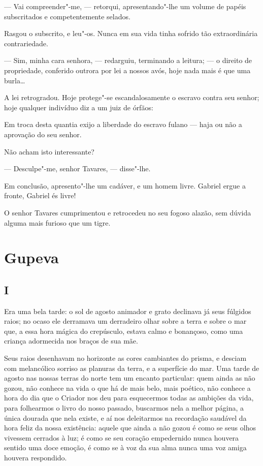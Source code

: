 --- Vai compreender"-me, --- retorqui, apresentando"-lhe um volume de
papéis subscritados e competentemente selados.

Rasgou o subscrito, e leu"-os. Nunca em sua vida tinha sofrido tão
extraordinária contrariedade.

--- Sim, minha cara senhora, --- redarguiu, terminando a leitura; --- o
direito de propriedade, conferido outrora por lei a nossos avós, hoje
nada mais é que uma burla\ldots{}

A lei retrogradou. Hoje protege"-se escandalosamente o escravo contra seu
senhor; hoje qualquer indivíduo diz a um juiz de órfãos:

Em troca desta quantia exijo a liberdade do escravo fulano --- haja ou
não a aprovação do seu senhor.

Não acham isto interessante?

--- Desculpe"-me, senhor Tavares, --- disse"-lhe.

Em conclusão, apresento"-lhe um cadáver, e um homem livre. Gabriel ergue
a fronte, Gabriel és livre!

O senhor Tavares cumprimentou e retrocedeu no seu fogoso alazão, sem
dúvida alguma mais furioso que um tigre.

\chapter{Gupeva}

\section{I}

Era uma bela tarde: o sol de agosto animador e grato declinava já seus
fúlgidos raios; no ocaso ele derramava um derradeiro olhar sobre a terra
e sobre o mar que, a essa hora mágica do crepúsculo, estava calmo e
bonançoso, como uma criança adormecida nos braços de sua mãe.

Seus raios desenhavam no horizonte as cores cambiantes do prisma, e
desciam com melancólico sorriso as planuras da terra, e a superfície do
mar. Uma tarde de agosto nas nossas terras do norte tem um encanto
particular: quem ainda as não gozou, não conhece na vida o que há de
mais belo, mais poético, não conhece a hora do dia que o Criador nos deu
para esquecermos todas as ambições da vida, para folhearmos o livro do
nosso passado, buscarmos nela a melhor página, a única dourada que nela
existe, e aí nos deleitarmos na recordação saudável da hora feliz da
nossa existência: aquele que ainda a não gozou é como se seus olhos
vivessem cerrados à luz; é como se seu coração empedernido nunca houvera
sentido uma doce emoção, é como se à voz da sua alma nunca uma voz amiga
houvera respondido.

